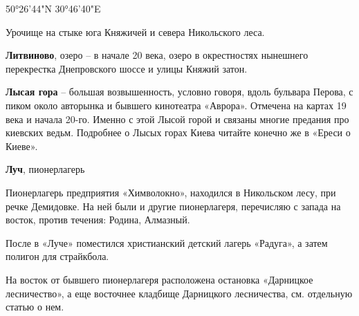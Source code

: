 50°26'44"N 30°46'40"E

Урочище на стыке юга Княжичей и севера Никольского леса.\\

\medskip

\textbf{Литвиново}, озеро – в начале 20 века, озеро в окрестностях нынешнего перекрестка Днепровского шоссе и улицы Княжий затон.\\

\medskip

\textbf{Лысая гора} – большая возвышенность, условно говоря, вдоль бульвара Перова, с пиком около авторынка и бывшего кинотеатра «Аврора». Отмечена на картах 19 века и начала 20-го. Именно с этой Лысой горой и связаны многие предания про киевских ведьм. Подробнее о Лысых горах Киева читайте конечно же в «Ереси о Киеве».\\

\medskip

\textbf{Луч}, пионерлагерь


Пионерлагерь предприятия «Химволокно», находился в Никольском лесу, при речке Демидовке. На ней были и другие пионерлагеря, перечисляю с запада на восток, против течения: Родина, Алмазный.
 
После в «Луче» поместился христианский детский лагерь «Радуга», а затем полигон для страйкбола. 

На восток от бывшего пионерлагеря расположена остановка «Дарницкое лесничество», а еще восточнее кладбище Дарницкого лесничества, см. отдельную статью о нем.